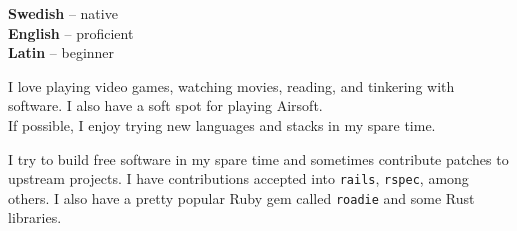 \documentclass[9pt]{developercv} %
\begin{document}
\begin{minipage}[t]{0.3\textwidth}
  \vspace{-\baselineskip} %


  \textbf{Swedish} -- native\\
  \textbf{English} -- proficient\\
  \textbf{Latin} -- beginner
\end{minipage}
\hfill
\begin{minipage}[t]{0.3\textwidth}
  \vspace{-\baselineskip} %


  I love playing video games, watching movies, reading, and tinkering with
  software. I also have a soft spot for playing Airsoft.\\ If possible, I enjoy
  trying new languages and stacks in my spare time.
\end{minipage}
\hfill
\begin{minipage}[t]{0.3\textwidth}
  \vspace{-\baselineskip} %


  I try to build free software in my spare time and sometimes contribute
  patches to upstream projects. I have contributions accepted into
  \texttt{rails}, \texttt{rspec}, among others. I also have a pretty popular
  Ruby gem called \texttt{roadie} and some Rust libraries.
\end{minipage}


\end{document}
